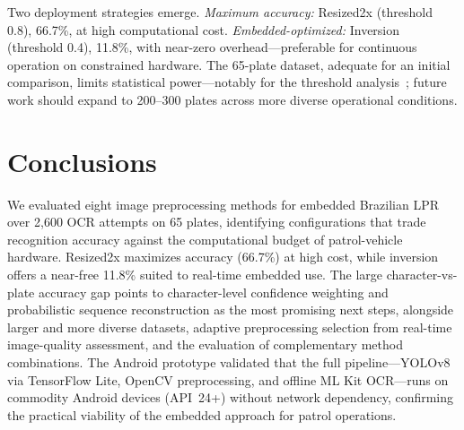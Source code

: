 \documentclass[conference,hidelinks]{IEEEtran}
\begin{document}
Two deployment strategies emerge. \textit{Maximum accuracy:} Resized2x (threshold 0.8), 66.7\%, at high computational cost. \textit{Embedded-optimized:} Inversion (threshold 0.4), 11.8\%, with near-zero overhead—preferable for continuous operation on constrained hardware. The 65-plate dataset, adequate for an initial comparison, limits statistical power—notably for the threshold analysis~\cite{qin2022towards}; future work should expand to 200--300 plates across more diverse operational conditions.

\section{Conclusions}
\label{sec: conclusions}

We evaluated eight image preprocessing methods for embedded Brazilian LPR over 2{,}600 OCR attempts on 65 plates, identifying configurations that trade recognition accuracy against the computational budget of patrol-vehicle hardware. Resized2x maximizes accuracy (66.7\%) at high cost, while inversion offers a near-free 11.8\% suited to real-time embedded use. The large character-vs-plate accuracy gap points to character-level confidence weighting and probabilistic sequence reconstruction as the most promising next steps, alongside larger and more diverse datasets, adaptive preprocessing selection from real-time image-quality assessment, and the evaluation of complementary method combinations. The Android prototype validated that the full pipeline—YOLOv8 via TensorFlow Lite, OpenCV preprocessing, and offline ML Kit OCR—runs on commodity Android devices (API~24+) without network dependency, confirming the practical viability of the embedded approach for patrol operations.



\end{document}
